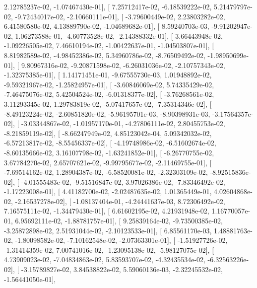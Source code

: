 \documentclass{article}
\begin{document}
          2.12785237e-02,  -1.07467430e-01],
       [  7.25712417e-02,  -6.18539222e-02,   5.21479797e-02,
         -9.72434017e-02,  -2.10660111e-01],
       [ -3.79600449e-02,   2.23803282e-02,   6.41580580e-02,
          4.13889790e-02,  -1.04689682e-01],
       [  8.59240703e-03,  -9.91202947e-02,   1.06273588e-01,
         -4.60773528e-02,  -2.14388332e-01],
       [  3.66443948e-02,  -1.09226505e-02,   7.46610194e-02,
         -1.00422637e-01,  -1.04503807e-01],
       [  8.81982589e-02,  -4.98452386e-02,   5.34960786e-02,
         -8.76509492e-02,  -1.98950699e-01],
       [  9.80967316e-02,  -9.20871598e-02,  -6.26031036e-02,
         -2.10757343e-02,  -1.32375385e-01],
       [  1.14171451e-01,  -9.67555730e-03,   1.01948892e-02,
         -9.59321967e-02,  -1.25824957e-01],
       [ -3.60846069e-02,   5.74335429e-02,  -7.46475076e-02,
          5.42504524e-02,  -6.01318377e-02],
       [ -3.76268561e-02,   3.11293345e-02,   1.29783819e-02,
         -5.07417657e-02,  -7.35314346e-02],
       [ -8.49123224e-02,  -2.60851820e-02,  -5.96195701e-03,
         -8.90398931e-03,  -3.17564357e-02],
       [ -3.03344867e-02,  -1.01957170e-01,  -4.27806111e-02,
          2.80455753e-02,  -8.21859119e-02],
       [ -8.66247949e-02,   4.85123042e-04,   5.09342032e-02,
         -6.57213817e-02,  -8.55456337e-02],
       [ -4.19748986e-02,  -6.51602674e-02,  -8.60135666e-02,
          3.16107798e-02,  -1.63241852e-01],
       [ -6.26770755e-02,   3.67784270e-02,   2.65707621e-02,
         -9.99795677e-02,  -2.11469755e-01],
       [ -7.69514162e-02,   1.28904387e-02,  -6.58520081e-02,
         -2.32303109e-02,  -8.92515836e-02],
       [ -4.01555483e-02,  -9.51516847e-02,   3.97026386e-02,
         -7.83346492e-02,  -1.17223008e-01],
       [  4.41182700e-02,  -2.02487635e-02,   1.01365449e-01,
          4.02604868e-02,  -2.16537278e-02],
       [ -1.08137404e-01,  -4.24441637e-03,   8.72306492e-02,
          7.16575111e-02,  -1.34479430e-01],
       [  6.61602195e-02,   4.21931948e-02,   1.16770057e-01,
          6.95692111e-02,  -1.88781757e-01],
       [  9.25839164e-02,  -9.73500385e-02,  -3.25872898e-02,
          2.51931044e-02,  -2.10123533e-01],
       [  6.85561170e-03,   1.48881763e-02,  -1.80098582e-02,
         -7.10162548e-02,  -2.07363301e-01],
       [ -1.51927726e-02,  -1.31414359e-02,   7.00741016e-02,
         -1.23095138e-02,  -5.98127075e-02],
       [  4.73909023e-02,  -7.04834863e-02,   5.83593707e-02,
         -4.32435534e-02,  -6.32563226e-02],
       [ -3.15789827e-02,   3.84538822e-02,   5.59060136e-03,
         -2.32245532e-02,  -1.56441050e-01],
\end{document}
